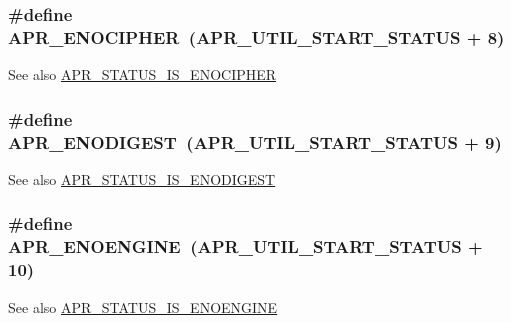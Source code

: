 \subsubsection[{\texorpdfstring{A\+P\+R\+\_\+\+E\+N\+O\+C\+I\+P\+H\+ER}{APR_ENOCIPHER}}]{\setlength{\rightskip}{0pt plus 5cm}\#define A\+P\+R\+\_\+\+E\+N\+O\+C\+I\+P\+H\+ER~({\bf A\+P\+R\+\_\+\+U\+T\+I\+L\+\_\+\+S\+T\+A\+R\+T\+\_\+\+S\+T\+A\+T\+US} + 8)}\hypertarget{group__APR__Util__Error_ga6b546475980180206e4286e35befaf55}{}\label{group__APR__Util__Error_ga6b546475980180206e4286e35befaf55}
\begin{DoxySeeAlso}{See also}
\hyperlink{group__APR__Util__Error_ga8b6a993f66cfa692820018a7a0bf7ee6}{A\+P\+R\+\_\+\+S\+T\+A\+T\+U\+S\+\_\+\+I\+S\+\_\+\+E\+N\+O\+C\+I\+P\+H\+ER} 
\end{DoxySeeAlso}
\subsubsection[{\texorpdfstring{A\+P\+R\+\_\+\+E\+N\+O\+D\+I\+G\+E\+ST}{APR_ENODIGEST}}]{\setlength{\rightskip}{0pt plus 5cm}\#define A\+P\+R\+\_\+\+E\+N\+O\+D\+I\+G\+E\+ST~({\bf A\+P\+R\+\_\+\+U\+T\+I\+L\+\_\+\+S\+T\+A\+R\+T\+\_\+\+S\+T\+A\+T\+US} + 9)}\hypertarget{group__APR__Util__Error_ga93f22e73099e3cd744ea96da38602065}{}\label{group__APR__Util__Error_ga93f22e73099e3cd744ea96da38602065}
\begin{DoxySeeAlso}{See also}
\hyperlink{group__APR__Util__Error_ga13ab217618d8b37c7d85c7c2080908a0}{A\+P\+R\+\_\+\+S\+T\+A\+T\+U\+S\+\_\+\+I\+S\+\_\+\+E\+N\+O\+D\+I\+G\+E\+ST} 
\end{DoxySeeAlso}
\subsubsection[{\texorpdfstring{A\+P\+R\+\_\+\+E\+N\+O\+E\+N\+G\+I\+NE}{APR_ENOENGINE}}]{\setlength{\rightskip}{0pt plus 5cm}\#define A\+P\+R\+\_\+\+E\+N\+O\+E\+N\+G\+I\+NE~({\bf A\+P\+R\+\_\+\+U\+T\+I\+L\+\_\+\+S\+T\+A\+R\+T\+\_\+\+S\+T\+A\+T\+US} + 10)}\hypertarget{group__APR__Util__Error_gacda8be948c23dbd1347f3302fb1c577f}{}\label{group__APR__Util__Error_gacda8be948c23dbd1347f3302fb1c577f}
\begin{DoxySeeAlso}{See also}
\hyperlink{group__APR__Util__Error_ga9574130dd48e4d76082c7837d052d8d0}{A\+P\+R\+\_\+\+S\+T\+A\+T\+U\+S\+\_\+\+I\+S\+\_\+\+E\+N\+O\+E\+N\+G\+I\+NE} 
\end{DoxySeeAlso}
